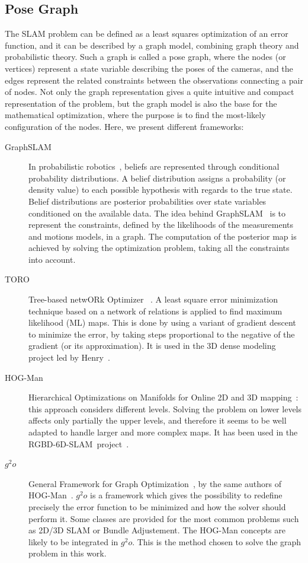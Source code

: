 \subsection{Pose Graph}

The \gls{SLAM} problem can be defined as a least squares optimization of an error function, and it can be described by a graph model, combining graph theory and probabilistic theory. Such a graph is called a pose graph, where the nodes (or vertices) represent a state variable describing the poses of the cameras, and the edges represent the related constraints between the observations connecting a pair of nodes. Not only the graph representation gives a quite intuitive and compact representation of the problem, but the graph model is also the base for the mathematical optimization, where the purpose is to find the most-likely configuration of the nodes. Here, we present different frameworks:

\begin{description}
\item[GraphSLAM] In probabilistic robotics~\cite{Thrun_2005}, beliefs are represented through conditional probability distributions. A belief distribution assigns a probability (or density value) to each possible hypothesis with regards to the true state. Belief distributions are posterior probabilities over state variables conditioned on the available data. The idea behind GraphSLAM~\cite{Thrun05_GraphSLAM} is to represent the constraints, defined by the likelihoods of the measurements and motions models, in a graph. The computation of the posterior map is achieved by solving the optimization problem, taking all the constraints into account.
\item[TORO] Tree-based netwORk Optimizer ~\cite{grisetti07rss}. A least square error minimization technique based on a network of relations is applied to find maximum likelihood (ML) maps. This is done by using a variant of gradient descent to minimize the error, by taking steps proportional to the negative of the gradient (or its approximation). It is used in the 3D dense modeling project led by Henry~\cite{Henry_RGBD_2010}.
\item[HOG-Man] Hierarchical Optimizations on Manifolds for Online 2D and 3D mapping~\cite{hogman_2010}: this approach considers different levels. Solving the problem on lower levels affects only partially the upper levels, and therefore it seems to be well adapted to handle larger and more complex maps. It has been used in the RGBD-6D-SLAM~project~\cite{engelhard11euron-workshop}.
\item[$g^2o$] General Framework for Graph Optimization~\cite{g2o_2011}, by the same authors of HOG-Man~\cite{hogman_2010}. $g^2o$ is a framework which gives the possibility to redefine precisely the error function to be minimized and how the solver should perform it. Some classes are provided for the most common problems such as 2D/3D \gls{SLAM} or Bundle Adjustement. The HOG-Man concepts are likely to be integrated in $g^2o$. This is the method chosen to solve the graph problem in this work.
\end{description}

